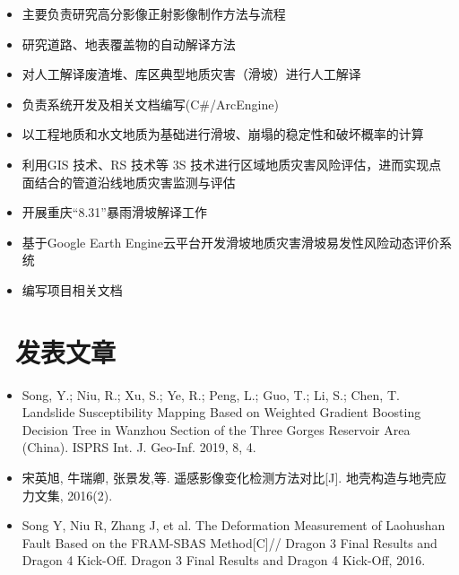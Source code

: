\documentclass{resume}
\begin{document}
\begin{itemize}
  \item 主要负责研究高分影像正射影像制作方法与流程
  \item 研究道路、地表覆盖物的自动解译方法
  \item 对人工解译废渣堆、库区典型地质灾害（滑坡）进行人工解译
\end{itemize}

\begin{itemize}
  \item 负责系统开发及相关文档编写(C\#/ArcEngine)
  \item 以工程地质和水文地质为基础进行滑坡、崩塌的稳定性和破坏概率的计算
  \item 利用GIS 技术、RS 技术等 3S 技术进行区域地质灾害风险评估，进而实现点面结合的管道沿线地质灾害监测与评估
\end{itemize}

\begin{itemize}
  \item 开展重庆“8.31”暴雨滑坡解译工作
  \item 基于Google Earth Engine云平台开发滑坡地质灾害滑坡易发性风险动态评价系统
  \item 编写项目相关文档
\end{itemize}


\section{\faUsers\ 发表文章}
\begin{itemize}

\item  Song, Y.; Niu, R.; Xu, S.; Ye, R.; Peng, L.; Guo, T.; Li, S.; Chen, T. Landslide Susceptibility Mapping Based on Weighted Gradient Boosting Decision Tree in Wanzhou Section of the Three Gorges Reservoir Area (China). ISPRS Int. J. Geo-Inf. 2019, 8, 4.
\item 宋英旭, 牛瑞卿, 张景发,等. 遥感影像变化检测方法对比[J]. 地壳构造与地壳应力文集, 2016(2).
\item Song Y, Niu R, Zhang J, et al. The Deformation Measurement of Laohushan Fault Based on the FRAM-SBAS Method[C]// Dragon 3 Final Results and Dragon 4 Kick-Off. Dragon 3 Final Results and Dragon 4 Kick-Off, 2016.
\end{itemize}
\end{document}
